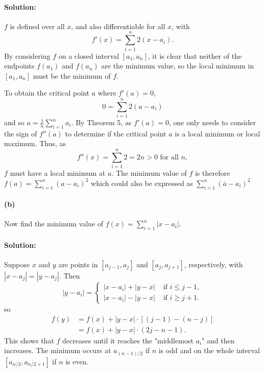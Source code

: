 \documentclass{article}
\begin{document}
\paragraph{Solution:} $f$ is defined over all $x$, and also differentiable for
all $x$, with \begin{equation*}
  f'(x) = \sum_{i = 1}^n 2(x - a_i).
\end{equation*} By considering $f$ on a closed interval $[a_1, a_n]$, it is
clear that neither of the endpoints $f(a_1)$ and $f(a_n)$ are the minimum
value, so the local minimum in $[a_1, a_n]$ must be the minimum of $f$.

To obtain the critical point $a$ where $f'(a) = 0$, \begin{equation*}
  0 = \sum_{i = 1}^n 2(a - a_i)
\end{equation*} and so $a = \frac{1}{n}\sum_{i = 1}^n a_i$. By Theorem 5, as
$f'(a) = 0$, one only needs to consider the sign of $f''(a)$ to determine if
the critical point $a$ is a local minimum or local maximum. Thus, as
\begin{equation*}
  f''(x) = \sum_{i = 1}^n 2 = 2n > 0 \text{ for all } n,
\end{equation*} $f$ must have a local minimum at $a$. The minimum value of $f$
is therefore $f(a) = \sum_{i = 1}^n (a - a_i)^2$ which could also be expressed
as $\sum_{i = 1}^n (\overline{a} - a_i)^2$

\paragraph{(b)} Now find the minimum value of $f(x) = \sum_{i = 1}^n |x -
a_i|$.

\paragraph{Solution:} Suppose $x$ and $y$ are points in $[a_{j - 1}, a_j]$ and
$[a_j, a_{j + 1}]$, respectively, with $|x - a_j| = |y - a_j|$. Then
\begin{equation*}
  |y - a_i| = \begin{cases}
    |x - a_i| + |y - x| &\text{ if } i \leq j - 1, \\
    |x - a_i| - |y - x| &\text{ if } i \geq j + 1.
  \end{cases}
\end{equation*} so \begin{align*}
  f(y) &= f(x) + |y - x| \cdot [(j - 1) - (n - j)] \\
    &= f(x) + |y - x| \cdot (2j - n - 1).
\end{align*} This shows that $f$ decreases until it reaches the "middlemost
$a_i$" and then increases. The minimum occurs at $a_{(n - 1)/2}$ if $n$ is odd
and on the whole interval $[a_{n/2}, a_{n/2 + 1}]$ if $n$ is even.
\end{document}
